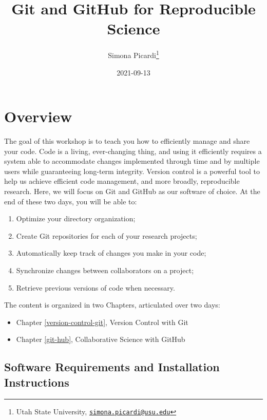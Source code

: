 \documentclass[
]{book}
\title{Git and GitHub for Reproducible Science}
\author{Simona Picardi\footnote{Utah State University, \href{mailto:simona.picardi@usu.edu}{\nolinkurl{simona.picardi@usu.edu}}}}
\date{2021-09-13}
\providecommand{\tightlist}{%
  \setlength{\itemsep}{0pt}\setlength{\parskip}{0pt}}
\begin{document}
\maketitle

{
\setcounter{tocdepth}{1}
\tableofcontents
}
\hypertarget{overview}{%
\chapter{Overview}\label{overview}}

The goal of this workshop is to teach you how to efficiently manage and share
your code. Code is a living, ever-changing thing, and using it efficiently
requires a system able to accommodate changes implemented through time and by
multiple users while guaranteeing long-term integrity. Version control is a
powerful tool to help us achieve efficient code management, and more broadly,
reproducible research. Here, we will focus on Git and GitHub as our software of
choice. At the end of these two days, you will be able to:

\begin{enumerate}
\def\labelenumi{\arabic{enumi}.}
\tightlist
\item
  Optimize your directory organization;
\item
  Create Git repositories for each of your research projects;
\item
  Automatically keep track of changes you make in your code;
\item
  Synchronize changes between collaborators on a project;
\item
  Retrieve previous versions of code when necessary.
\end{enumerate}

The content is organized in two Chapters, articulated over two days:

\begin{itemize}
\tightlist
\item
  Chapter \ref{version-control-git}, Version Control with Git
\item
  Chapter \ref{git-hub}, Collaborative Science with GitHub
\end{itemize}

\hypertarget{software-requirements-and-installation-instructions}{%
\section{Software Requirements and Installation Instructions}\label{software-requirements-and-installation-instructions}}
\end{document}
